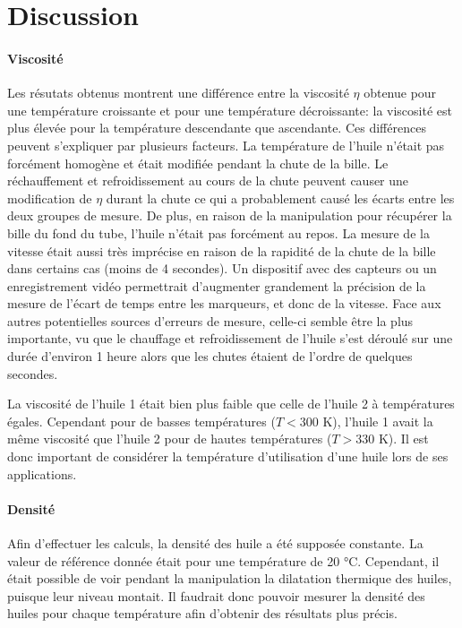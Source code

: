 \section{Discussion}

\paragraph{Viscosité} Les résutats obtenus montrent une différence entre la viscosité \(\eta\) obtenue pour une température croissante et pour une température décroissante: la viscosité est plus élevée pour la température descendante que ascendante. Ces différences peuvent s'expliquer par plusieurs facteurs. La température de l'huile n'était pas forcément homogène et était modifiée pendant la chute de la bille. Le réchauffement et refroidissement au cours de la chute peuvent causer une modification de $\eta$ durant la chute ce qui a probablement causé les écarts entre les deux groupes de mesure. De plus, en raison de la manipulation pour récupérer la bille du fond du tube, l'huile n'était pas forcément au repos. La mesure de la vitesse était aussi très imprécise en raison de la rapidité de la chute de la bille dans certains cas (moins de 4 secondes). Un dispositif avec des capteurs ou un enregistrement vidéo permettrait d'augmenter grandement la précision de la mesure de l'écart de temps entre les marqueurs, et donc de la vitesse. Face aux autres potentielles sources d'erreurs de mesure, celle-ci semble être la plus importante, vu que le chauffage et refroidissement de l'huile s'est déroulé sur une durée d'environ 1 heure alors que les chutes étaient de l'ordre de quelques secondes.

La viscosité de l'huile 1 était bien plus faible que celle de l'huile 2 à températures égales. Cependant pour de basses températures (\(T < 300\) \si{\kelvin}), l'huile 1 avait la même viscosité que l'huile 2 pour de hautes températures (\(T > 330\) \si{\kelvin}). Il est donc important de considérer la température d'utilisation d'une huile lors de ses applications.

\paragraph{Densité} Afin d'effectuer les calculs, la densité des huile a été supposée constante. La valeur de référence donnée était pour une température de 20 \si{\celsius}. Cependant, il était possible de voir pendant la manipulation la dilatation thermique des huiles, puisque leur niveau montait. Il faudrait donc pouvoir mesurer la densité des huiles pour chaque température afin d'obtenir des résultats plus précis.




